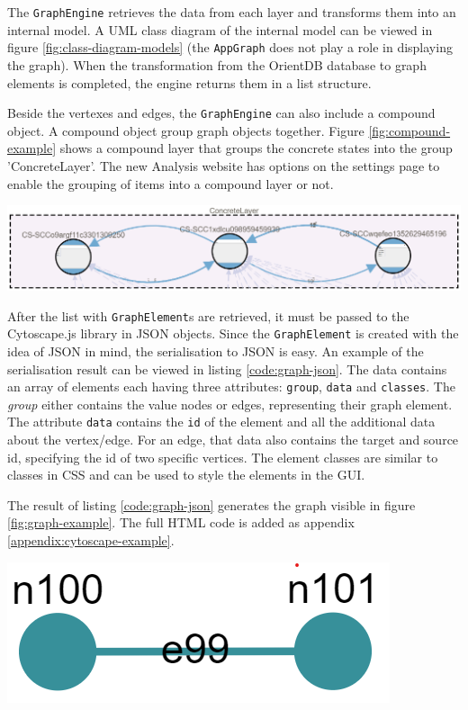 The \verb|GraphEngine| retrieves the data from each layer and transforms them into an internal model. A UML class diagram of the internal model can be viewed in figure \ref{fig:class-diagram-models} (the \verb|AppGraph| does not play a role in displaying the graph). When the transformation from the OrientDB database to graph elements is completed, the engine returns them in a list structure. 

Beside the vertexes and edges, the \verb|GraphEngine| can also include a compound object. A compound object group graph objects together. Figure \ref{fig:compound-example} shows a compound layer that groups the concrete states into the group 'ConcreteLayer'. The new Analysis website has options on the settings page to enable the grouping of items into a compound layer or not.

\begingroup
\captionsetup{type=figure}
\includegraphics[scale=0.6]{content/5-Results/Images/compound-layer.png}
\label{fig:compound-example}
\endgroup

After the list with \verb|GraphElement|s are retrieved, it must be passed to the Cytoscape.js library in JSON objects. Since the \verb|GraphElement| is created with the idea of JSON in mind, the serialisation to JSON is easy. An example of the serialisation result can be viewed in listing \ref{code:graph-json}. The data contains an array of elements each having three attributes: \verb|group|, \verb|data| and \verb|classes|. The \textit{group} either contains the value nodes or edges, representing their graph element. The attribute \verb|data| contains the \verb|id| of the element and all the additional data about the vertex/edge. For an edge, that data also contains the target and source id, specifying the id of two specific vertices. The element classes are similar to classes in \textsc{CSS} and can be used to style the elements in the GUI. 

The result of listing \ref{code:graph-json} generates the graph visible in figure \ref{fig:graph-example}. The full HTML code is added as appendix \ref{appendix:cytoscape-example}. 

\begingroup
\captionsetup{type=figure}
\includegraphics[scale=0.6]{content/5-Results/Images/graph-example.png}
\label{fig:graph-example}
\endgroup

